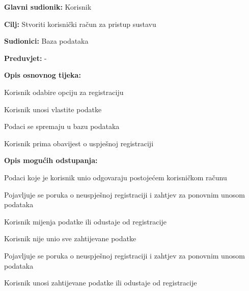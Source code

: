 					\noindent {}
					\begin{packed_item}
						
						\item \textbf{Glavni sudionik: }Korisnik 
						\item  \textbf{Cilj:} Stvoriti korisnički račun za pristup sustavu
						\item  \textbf{Sudionici:} Baza podataka
						\item  \textbf{Preduvjet:} -
						\item  \textbf{Opis osnovnog tijeka:}
						
						\item[] \begin{packed_enum}
							
							\item Korisnik odabire opciju za registraciju
							\item Korisnik unosi vlastite podatke
							\item Podaci se spremaju u bazu podataka
							\item Korisnik prima obavijest o uspješnoj registraciji
						\end{packed_enum}
						
						\item  \textbf{Opis mogućih odstupanja:}
						
						\item[] \begin{packed_item}
							
							\item[2.a] Podaci koje je korisnik unio odgovaraju postojećem korisničkom računu
							\item[] \begin{packed_enum}
								
								\item Pojavljuje se poruka o neuspješnoj registraciji i zahtjev za ponovnim unosom podataka
								\item Korisnik mijenja podatke ili odustaje od registracije
								
							\end{packed_enum}
							\item[2.b] Korisnik nije unio sve zahtijevane podatke
								\item[] \begin{packed_enum}
								
								\item Pojavljuje se poruka o neuspješnoj registraciji i zahtjev za ponovnim unosom podataka
								\item Korisnik unosi zahtijevane podatke ili odustaje od registracije
								
							\end{packed_enum}
							
						\end{packed_item}
					\end{packed_item}
					
